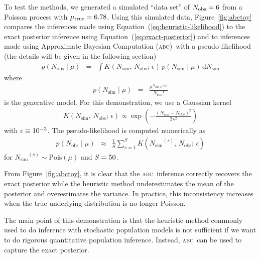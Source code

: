 \documentclass[manuscript, letterpaper]{aastex}
\newcommand{\accronym}[1]{\textsc{#1}}
\newcommand{\dfmfigref}[1]{\ref{fig:#1}}
\newcommand{\dfmFig}[1]{Figure~\dfmfigref{#1}}
\newcommand{\dfmfig}[1]{\dfmFig{#1}}
\renewcommand{\eqref}[1]{\ref{eq:#1}}
\newcommand{\Eq}[1]{Equation~(\eqref{#1})}
\newcommand{\eq}[1]{\Eq{#1}}
\newcommand{\eqlabel}[1]{\label{eq:#1}}
\newcommand{\dd}{\ensuremath{\,\mathrm{d}}}
\newcommand{\obs}{{\ensuremath{\mathrm{obs}}}}
\newcommand{\simu}{{\ensuremath{\mathrm{sim}}}}
\def\abc{Approximate Bayesian Computation (\accronym{abc})\def\abc{\accronym{abc}}}
\begin{document}
To test the methods, we generated a simulated ``data set'' of $N_\obs =
\abctoynobs$ from a Poisson process with $\mu_\mathrm{true} = {6.78}$.
Using this simulated data, \dfmfig{abctoy} compares the inferences made using
\eq{heuristic-likelihood} to the exact posterior inference using
\eq{exact-posterior} and to inferences made using \abc\ with a
pseudo-likelihood (the details will be given in the following section)
\begin{eqnarray}\eqlabel{pseudo-likelihood}
p(N_\obs\mid\mu) &=& \int K(N_\simu,\,N_\obs;\,\epsilon)\,
    p(N_\simu\mid\mu) \dd N_\simu
\end{eqnarray}
where
\begin{eqnarray}
p(N_\simu\mid\mu) &=& \frac{\mu^{N_\simu}\,e^{-\mu}}{N_\simu!}
\end{eqnarray}
is the generative model.
For this demonstration, we use a Gaussian kernel
\begin{eqnarray}
K(N_\simu,\,N_\obs;\,\epsilon) \propto \exp\left(
    -\frac{(N_\simu - N_\obs)^2}{2\,\epsilon^2}
\right)
\end{eqnarray}
with $\epsilon \equiv {\ensuremath{10^{-3}}}$.
The pseudo-likelihood is computed numerically as
\begin{eqnarray}
p(N_\obs\mid\mu) &\approx& \frac{1}{S}\sum_{s=1}^S
    K({N_\simu}^{(s)},\,N_\obs;\,\epsilon)
\end{eqnarray}
for ${N_\simu}^{(s)} \sim \mathrm{Pois}(\mu)$ and $S = {50}$.

From \dfmfig{abctoy}, it is clear that the \abc\ inference correctly recovers
the exact posterior while the heuristic method underestimates the mean of the
posterior and overestimates the variance.
In practice, this inconsistency increases when the true underlying
distribution is no longer Poisson.

The main point of this demonstration is that the heuristic method commonly
used to do inference with stochastic population models is not sufficient if we
want to do rigorous quantitative population inference.
Instead, \abc\ can be used to capture the exact posterior.
\end{document}
